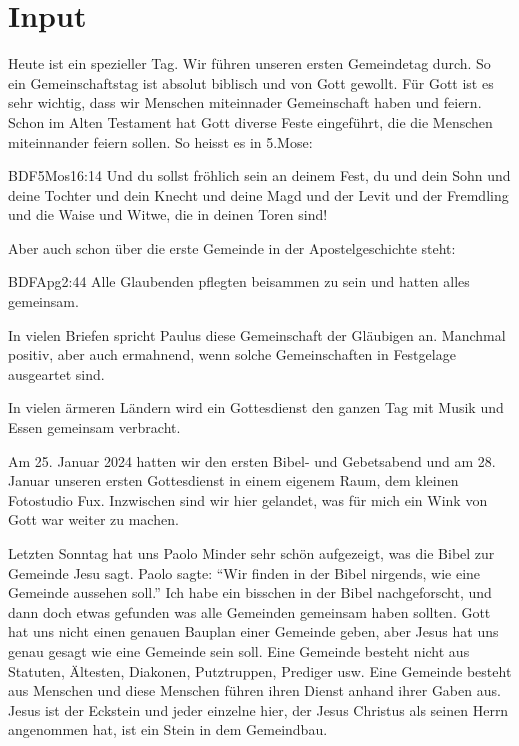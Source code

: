 \documentclass{../../inc/mybib}
\begin{document}
\section{ Input }
\begin{spacing}{1.5}
    Heute ist ein spezieller Tag. Wir führen unseren ersten Gemeindetag durch. So ein Gemeinschaftstag ist absolut biblisch und von Gott gewollt. Für Gott ist es sehr wichtig, dass wir Menschen miteinnader Gemeinschaft haben und feiern. Schon im Alten Testament hat Gott diverse Feste eingeführt, die die Menschen miteinnander feiern sollen. So heisst es in 5.Mose:
\begin{bibelbox}{BDF}{5Mos}{16:14}
    Und du sollst fröhlich sein an deinem Fest, du und dein Sohn und deine Tochter und dein Knecht und deine Magd und der Levit und der Fremdling und die Waise und Witwe, die in deinen Toren sind!
\end{bibelbox}
Aber auch schon über die erste Gemeinde in der Apostelgeschichte steht:
\begin{bibelbox}{BDF}{Apg}{2:44}
    Alle Glaubenden pflegten beisammen zu sein und hatten alles gemeinsam.
\end{bibelbox}
In vielen Briefen spricht Paulus diese Gemeinschaft der Gläubigen an. Manchmal positiv, aber auch ermahnend, wenn solche Gemeinschaften in Festgelage ausgeartet sind.

In vielen ärmeren Ländern wird ein Gottesdienst den ganzen Tag mit Musik und Essen gemeinsam verbracht.

Am 25. Januar 2024 hatten wir den ersten Bibel- und Gebetsabend und am 28. Januar unseren ersten Gottesdienst in einem eigenem Raum, dem kleinen Fotostudio Fux. Inzwischen sind wir hier gelandet, was für mich ein Wink von Gott war weiter zu machen.

Letzten Sonntag hat uns Paolo Minder sehr schön aufgezeigt, was die Bibel zur Gemeinde Jesu sagt. Paolo sagte: \enquote{Wir finden in der Bibel nirgends, wie eine Gemeinde aussehen soll.} Ich habe ein bisschen in der Bibel nachgeforscht, und dann doch etwas gefunden was alle Gemeinden gemeinsam haben sollten. Gott hat uns nicht einen genauen Bauplan einer Gemeinde geben, aber Jesus hat uns genau gesagt wie eine Gemeinde sein soll. Eine Gemeinde besteht nicht aus Statuten, Ältesten, Diakonen, Putztruppen, Prediger usw. Eine Gemeinde besteht aus Menschen und diese Menschen führen ihren Dienst anhand ihrer Gaben aus. Jesus ist der Eckstein und jeder einzelne hier, der Jesus Christus als seinen Herrn angenommen hat, ist ein Stein in dem Gemeindbau. 


\end{spacing}
\end{document}
